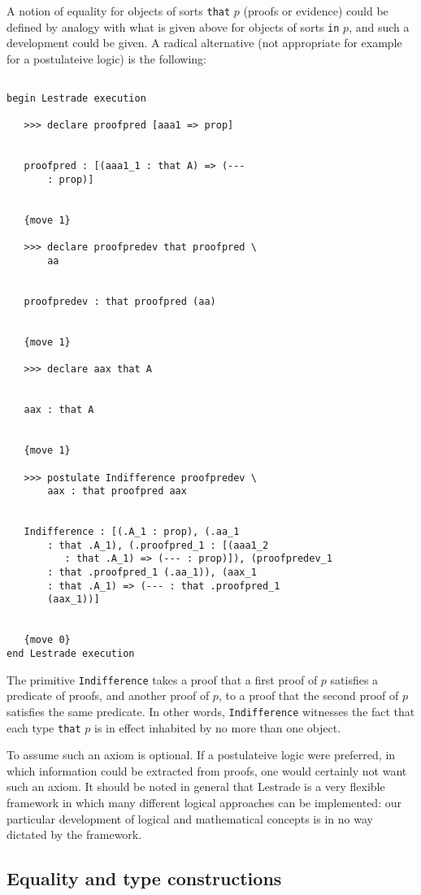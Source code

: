 \documentclass[12pt]{article}
\begin{document}
A notion of equality for objects of sorts {\tt that} $p$ (proofs or evidence) could be defined by analogy with what is given above for objects of sorts
{\tt in} $p$, and such a development could be given.  A radical alternative (not appropriate for example for a postulateive logic) is the following:

\begin{verbatim}

begin Lestrade execution

   >>> declare proofpred [aaa1 => prop]


   proofpred : [(aaa1_1 : that A) => (--- 
       : prop)]


   {move 1}

   >>> declare proofpredev that proofpred \
       aa


   proofpredev : that proofpred (aa)


   {move 1}

   >>> declare aax that A


   aax : that A


   {move 1}

   >>> postulate Indifference proofpredev \
       aax : that proofpred aax


   Indifference : [(.A_1 : prop), (.aa_1 
       : that .A_1), (.proofpred_1 : [(aaa1_2 
          : that .A_1) => (--- : prop)]), (proofpredev_1 
       : that .proofpred_1 (.aa_1)), (aax_1 
       : that .A_1) => (--- : that .proofpred_1 
       (aax_1))]


   {move 0}
end Lestrade execution
\end{verbatim}

The primitive {\tt Indifference} takes a proof that a first proof of $p$ satisfies a predicate of proofs, and another proof of $p$, to a proof that the second proof of $p$ satisfies the same predicate.  In other words, {\tt Indifference} witnesses the fact that each type {\tt that} $p$ is in effect inhabited by no more than one object.

To assume such an axiom is optional.  If a postulateive logic were preferred, in which information could be extracted from proofs, one would certainly not want such an axiom.  It should be noted in general that Lestrade is a very flexible framework in which many different logical approaches can be implemented:  our particular development of logical and mathematical concepts is in no way dictated by the framework.

\subsection{Equality and type constructions}
\end{document}
